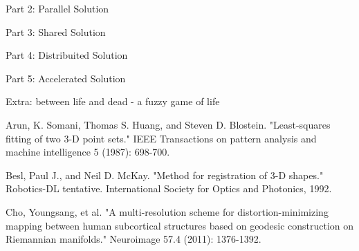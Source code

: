 \documentclass[11pt, twoside]{article}
\begin{document}
\noindent



\begin{center}
	\color{MidnightBlue} {\Large Part 2: Parallel Solution }\color{Black} 
\end{center}



\begin{center}
	\color{MidnightBlue} {\Large Part 3: Shared Solution }\color{Black} 
\end{center}



\begin{center}
	\color{MidnightBlue} {\Large Part 4: Distribuited Solution }\color{Black} 
\end{center}



\begin{center}
	\color{MidnightBlue} {\Large Part 5: Accelerated Solution }\color{Black} 
\end{center}

\begin{center}
	\color{MidnightBlue} {\Large Extra: between life and dead - a fuzzy game of life }\color{Black} 
\end{center}

\newpage
\begin{thebibliography}{2}
	
	Arun, K. Somani, Thomas S. Huang, and Steven D. Blostein. "Least-squares fitting of two 3-D point sets." IEEE Transactions on pattern analysis and machine intelligence 5 (1987): 698-700.
	
	Besl, Paul J., and Neil D. McKay. "Method for registration of 3-D shapes." Robotics-DL tentative. International Society for Optics and Photonics, 1992.
	
	Cho, Youngsang, et al. "A multi-resolution scheme for distortion-minimizing mapping between human subcortical structures based on geodesic construction on Riemannian manifolds." Neuroimage 57.4 (2011): 1376-1392.	
\end{thebibliography}
\end{document}
